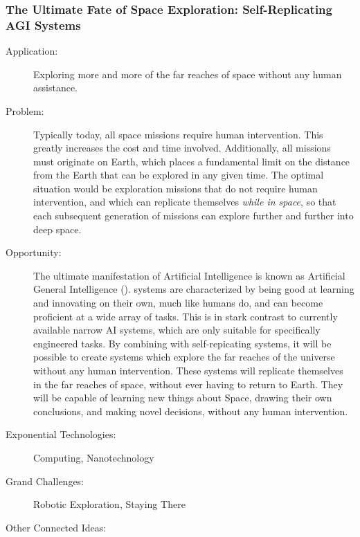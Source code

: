 \subsubsection{The Ultimate Fate of Space Exploration: Self-Replicating AGI Systems}

\begin{description}
\item[Application:]

Exploring more and more of the far reaches of space without any human
assistance.


\item[Problem:]

Typically today, all space missions require human intervention. This
greatly increases the cost and time involved. Additionally, all missions
must originate on Earth, which places a fundamental limit on the distance
from the Earth that can be explored in any given time. The optimal
situation would be exploration missions that do not require human
intervention, and which can replicate themselves \emph{while in space},
so that each subsequent generation of missions can explore further
and further into deep space.


\item[Opportunity:]

The ultimate manifestation of Artificial Intelligence is known as
Artificial General Intelligence ().  systems are characterized
by being good at learning and innovating on their own, much like humans
do, and can become proficient at a wide array of tasks. This is in
stark contrast to currently available narrow AI systems, which are
only suitable for specifically engineered tasks. By combining 
with self-repicating systems, it will be possible to create systems
which explore the far reaches of the universe without any human intervention.
These systems will replicate themselves in the far reaches of space,
without ever having to return to Earth. They will be capable of learning
new things about Space, drawing their own conclusions, and making
novel decisions, without any human intervention.


\item[Exponential Technologies:]

Computing, Nanotechnology


\item[Grand Challenges:]

Robotic Exploration, Staying There


\item[Other Connected Ideas:]


\end{description}

